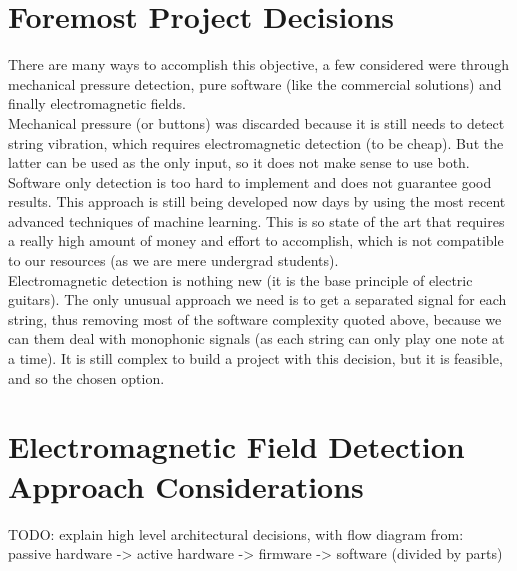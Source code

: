 \section{Foremost Project Decisions}
There are many ways to accomplish this objective, a few considered were through
mechanical pressure detection, pure software (like the commercial solutions) and
finally electromagnetic fields. \\
Mechanical pressure (or buttons) was discarded because it is still needs to detect
string vibration, which requires electromagnetic detection (to be cheap). But the latter can
be used as the only input, so it does not make sense to use both. \\
Software only detection is too hard to implement and does not guarantee good results.
This approach is still being developed now days by using the most recent advanced
techniques of machine learning. This is so state of the art that requires a really high
amount of money and effort to accomplish, which is not compatible to our resources
(as we are mere undergrad students). \\
Electromagnetic detection is nothing new (it is the base principle of electric guitars).
The only unusual approach we need is to get a separated signal for each string, thus
removing most of the software complexity quoted above, because we can them deal
with monophonic signals (as each string can only play one note at a time). It is
still complex to build a project with this decision, but it is feasible, and so
the chosen option.

\section{Electromagnetic Field Detection Approach Considerations}
TODO: explain high level architectural decisions, with flow diagram from: \\
passive hardware  -> active hardware -> firmware -> software (divided by parts)